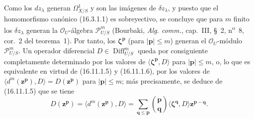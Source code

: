 \begin{env}[16.11.1]
Como los $dz_\lambda$ generan $\varOmega_{X/S}^1$ y son las imágenes de
$\delta z_\lambda$, y puesto que el homomorfismo canónico (16.3.1.1) es
sobreyectivo, se concluye que para $m$ finito los $\delta z_\lambda$ generan
la $\mathcal{O}_U$-álgebra $\mathscr{P}_{U/S}^m$ (Bourbaki,
\emph{Alg. comm.}, cap.~III, §~2, n\textsuperscript{o}~8, cor.~2 del teorema~1).
Por tanto, los $\boldsymbol{\zeta}^{\mathbf{p}}$ (para $|\mathbf{p}|\leq m$)
generan el $\mathcal{O}_U$-módulo $\mathscr{P}_{U/S}^m$. Un operador
diferencial $D\in\operatorname{Diff}_{U/S}^m$ queda por consiguiente
completamente determinado por los valores de
$\langle\boldsymbol{\zeta}^{\mathbf{p}},D\rangle$ para
$|\mathbf{p}|\leq m$, o, lo que es equivalente en virtud de
(16.11.1.5) y (16.11.1.6), por los valores
de $\langle d^m(\mathbf{z}^{\mathbf{p}}),D\rangle=D(\mathbf{z}^{\mathbf{p}})$
para $|\mathbf{p}|\leq m$; más precisamente, se deduce de (16.11.1.5) que
se tiene
\[
  D(\mathbf{z}^{\mathbf{p}})
  =\langle d^m(\mathbf{z}^{\mathbf{p}}),D\rangle
  =\sum_{\mathbf{q}\leq\mathbf{p}}
    \binom{\mathbf{p}}{\mathbf{q}}
    \langle\boldsymbol{\zeta}^{\mathbf{q}},D\rangle
    \mathbf{z}^{\mathbf{p}-\mathbf{q}}.
  \tag{16.11.1.7}
  \label{IV.16.11.1.7}
\]
\end{env}

